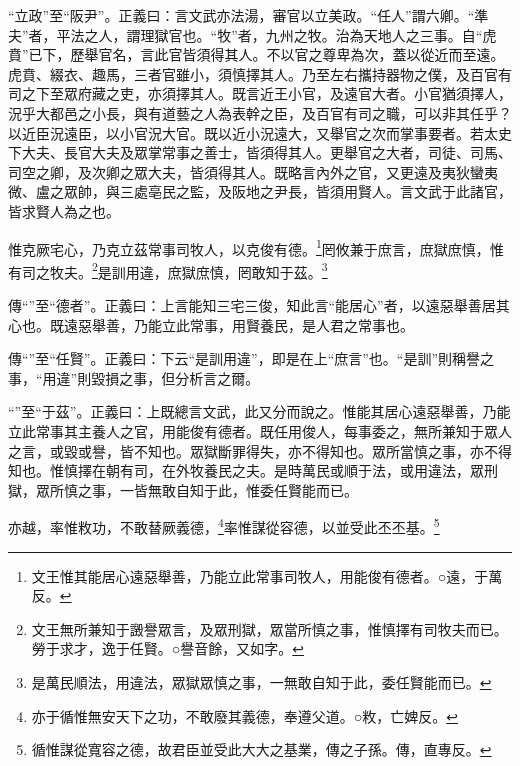 {\noindent\shu{}\fzkt “立政”至“阪尹”。正義曰：言文武亦法湯，審官以立美政。“任人”謂六卿。“準夫”者，平法之人，謂理獄官也。“牧”者，九州之牧。治為天地人之三事。自“虎賁”已下，歷舉官名，言此官皆須得其人。不以官之尊卑為次，蓋以從近而至遠。虎賁、綴衣、趣馬，三者官雖小，須慎擇其人。乃至左右攜持器物之僕，及百官有司之下至眾府藏之吏，亦須擇其人。既言近王小官，及遠官大者。小官猶須擇人，況乎大都邑之小長，與有道藝之人為表幹之臣，及百官有司之職，可以非其任乎？以近臣況遠臣，以小官況大官。既以近小況遠大，又舉官之次而掌事要者。若太史下大夫、長官大夫及眾掌常事之善士，皆須得其人。更舉官之大者，司徒、司馬、司空之卿，及次卿之眾大夫，皆須得其人。既略言內外之官，又更遠及夷狄蠻夷微、盧之眾帥，與三處亳民之監，及阪地之尹長，皆須用賢人。言文武于此諸官，皆求賢人為之也。 \par}

惟克厥宅心，乃克立茲常事司牧人，以克俊有德。\footnote{文王惟其能居心遠惡舉善，乃能立此常事司牧人，用能俊有德者。○遠，于萬反。}罔攸兼于庶言，庶獄庶慎，惟有司之牧夫。\footnote{文王無所兼知于譭譽眾言，及眾刑獄，眾當所慎之事，惟慎擇有司牧夫而已。勞于求才，逸于任賢。○譽音餘，又如字。}是訓用違，庶獄庶慎，罔敢知于茲。\footnote{是萬民順法，用違法，眾獄眾慎之事，一無敢自知于此，委任賢能而已。}


{\noindent\zhuan{}\fzbyks 傳“”至“德者”。正義曰：上言能知三宅三俊，知此言“能居心”者，以遠惡舉善居其心也。既遠惡舉善，乃能立此常事，用賢養民，是人君之常事也。 \par}

{\noindent\zhuan{}\fzbyks 傳“”至“任賢”。正義曰：下云“是訓用違”，即是在上“庶言”也。“是訓”則稱譽之事，“用違”則毀損之事，但分析言之爾。 \par}

{\noindent\shu{}\fzkt “”至“于茲”。正義曰：上既總言文武，此又分而說之。惟能其居心遠惡舉善，乃能立此常事其主養人之官，用能俊有德者。既任用俊人，每事委之，無所兼知于眾人之言，或毀或譽，皆不知也。眾獄斷罪得失，亦不得知也。眾所當慎之事，亦不得知也。惟慎擇在朝有司，在外牧養民之夫。是時萬民或順于法，或用違法，眾刑獄，眾所慎之事，一皆無敢自知于此，惟委任賢能而已。 \par}

亦越，率惟敉功，不敢替厥義德，\footnote{亦于循惟無安天下之功，不敢廢其義德，奉遵父道。○敉，亡婢反。}率惟謀從容德，以並受此丕丕基。\footnote{循惟謀從寬容之德，故君臣並受此大大之基業，傳之子孫。傳，直專反。}


